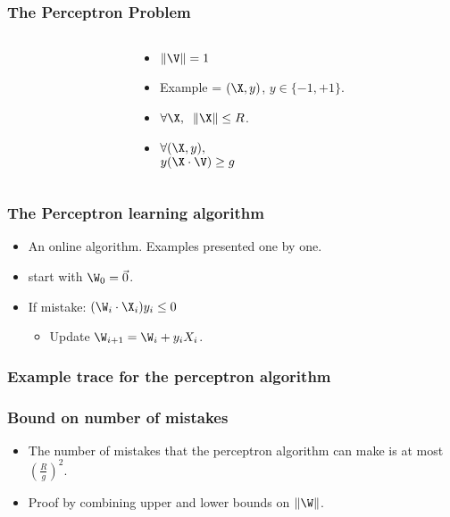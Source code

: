 \documentclass[handout]{beamer}
\begin{document}
\begin{frame}
\frametitle{The Perceptron Problem}
\begin{columns}
\begin{column}[T]{5.2cm}
\end{column}

\begin{column}[T]{4cm}
\begin{itemize}
\item
$\| \V \| =1$
\item 
Example = $(\X,y)$, $y \in \{-1,+1\}$.
\item
$\forall \X,\;\; \| \X \| \leq R$.
\item
$\forall (\X,y),$\\$y(\X \cdot \V) \geq g$
\end{itemize}
\end{column}
\end{columns}

\end{frame}

\begin{frame}
\frametitle{The Perceptron learning algorithm}
\begin{itemize}
\item An online algorithm. Examples presented one by one.
\item start with $\W_0 = \vec{0}$.
\item If mistake: $(\W_i \cdot \X_i) y_i \leq  0$
\begin{itemize}
\item Update $\W_{i+1} = \W_i + y_i X_i$.
\end{itemize}
\end{itemize}
\end{frame}

\begin{frame}
\frametitle{Example trace for the perceptron algorithm}
\end{frame}

\begin{frame}
\frametitle{Bound on number of mistakes}
\begin{itemize}
\item The number of mistakes that the perceptron algorithm can make is at most
$\left(\frac{R}{g}\right)^2$.
\item Proof by combining upper and lower bounds on $\| \W \|$.
\end{itemize}
\end{frame}
\end{document}
